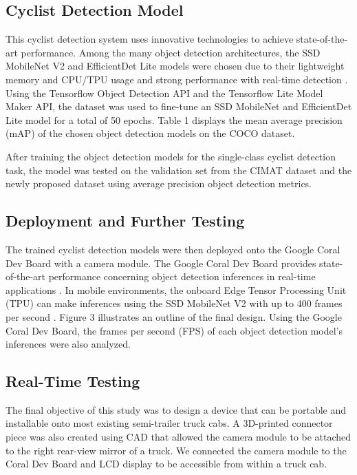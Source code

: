 \documentclass{article}
\begin{document}
\subsection{Cyclist Detection Model}
This cyclist detection system uses innovative technologies to achieve state-of-the-art performance. Among the many object detection architectures, the SSD MobileNet V2 and EfficientDet Lite models were chosen due to their lightweight memory and CPU/TPU usage and strong performance with real-time detection \cite{sandler_mobilenetv2_2018} \cite{tan_efficientdet_2020}. Using the Tensorflow Object Detection API and the Tensorflow Lite Model Maker API, the dataset was used to fine-tune an SSD MobileNet and EfficientDet Lite model for a total of 50 epochs. Table 1 displays the mean average precision (mAP) of the chosen object detection models on the COCO dataset.

After training the object detection models for the single-class cyclist detection task, the model was tested on the validation set from the CIMAT dataset and the newly proposed dataset using average precision object detection metrics. 

\subsection{Deployment and Further Testing}
The trained cyclist detection models were then deployed onto the Google Coral Dev Board with a camera module. The Google Coral Dev Board provides state-of-the-art performance concerning object detection inferences in real-time applications \cite{seshadri_evaluation_2022}. In mobile environments, the onboard Edge Tensor Processing Unit (TPU) can make inferences using the SSD MobileNet V2 with up to 400 frames per second \cite{seshadri_evaluation_2022}. Figure 3 illustrates an outline of the final design. Using the Google Coral Dev Board, the frames per second (FPS) of each object detection model’s inferences were also analyzed. 

\subsection{Real-Time Testing}
The final objective of this study was to design a device that can be portable and installable onto most existing semi-trailer truck cabs. A 3D-printed connector piece was also created using CAD that allowed the camera module to be attached to the right rear-view mirror of a truck. We connected the camera module to the Coral Dev Board and LCD display to be accessible from within a truck cab. 
\end{document}
